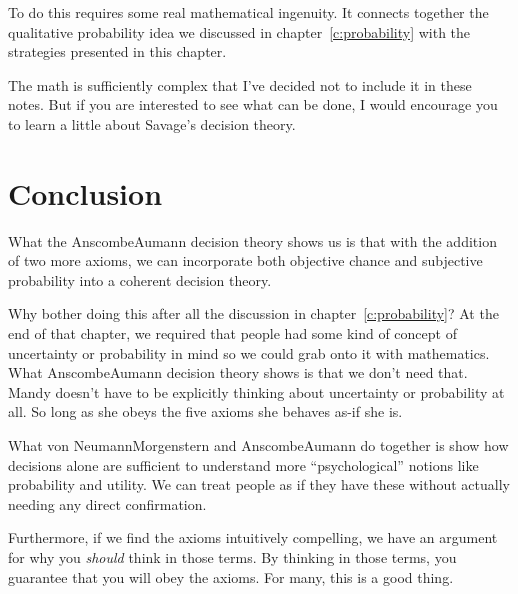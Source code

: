To do this requires some real mathematical ingenuity. It connects together the qualitative probability idea we discussed in chapter~\ref{c:probability} with the strategies presented in this chapter. 

The math is sufficiently complex that I've decided not to include it in these notes. But if you are interested to see what can be done, I would encourage you to learn a little about Savage's decision theory.

\section{Conclusion}

What the Anscombe\breakslash Aumann decision theory shows us is that with the addition of two more axioms, we can incorporate both objective chance and subjective probability into a coherent decision theory. 

Why bother doing this after all the discussion in chapter~\ref{c:probability}?  At the end of that chapter, we required that people had some kind of concept of uncertainty or probability in mind so we could grab onto it with mathematics.  What Anscombe\breakslash Aumann decision theory shows is that we don't need that.  Mandy doesn't have to be explicitly thinking about uncertainty or probability at all.  So long as she obeys the five axioms she behaves as-if she is.

What von Neumann\breakslash Morgenstern and Anscombe\breakslash Aumann do together is show how decisions alone are sufficient to understand more ``psychological'' notions like probability and utility.  We can treat people as if they have these without actually needing any direct confirmation.

Furthermore, if we find the axioms intuitively compelling, we have an argument for why you {\it should} think in those terms.  By thinking in those terms, you guarantee that you will obey the axioms.  For many, this is a good thing.